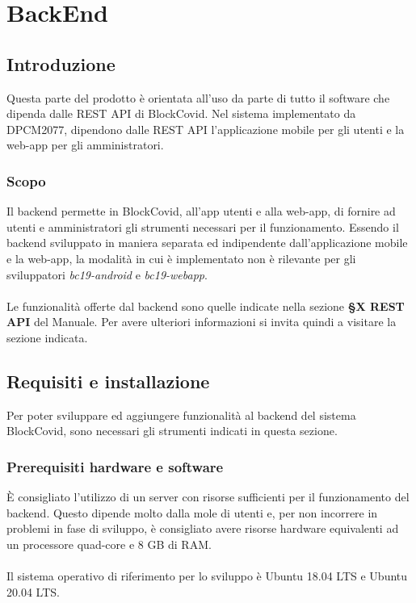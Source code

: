 \section{BackEnd}
\subsection{Introduzione}
Questa parte del prodotto è orientata all'uso da parte di tutto il software che dipenda dalle REST API di BlockCovid. Nel sistema implementato da DPCM2077, dipendono dalle REST API l'applicazione mobile per gli utenti e la web-app per gli amministratori.

\subsubsection{Scopo}
Il backend permette in BlockCovid, all'app utenti e alla web-app, di fornire ad utenti e amministratori gli strumenti necessari per il funzionamento. Essendo il backend sviluppato in maniera separata ed indipendente dall'applicazione mobile e la web-app, la modalità in cui è implementato non è rilevante per gli sviluppatori \textit{bc19-android} e \textit{bc19-webapp}.
\\
\\
Le funzionalità offerte dal backend sono quelle indicate nella sezione \textbf{§X REST API} del Manuale. Per avere ulteriori informazioni si invita quindi a visitare la sezione indicata.


\subsection{Requisiti e installazione}
Per poter sviluppare ed aggiungere funzionalità al backend del sistema BlockCovid, sono necessari gli strumenti indicati in questa sezione.

\subsubsection{Prerequisiti hardware e software}
È consigliato l'utilizzo di un server con risorse sufficienti per il funzionamento del backend. Questo dipende molto dalla mole di utenti e, per non incorrere in problemi in fase di sviluppo, è consigliato avere risorse hardware equivalenti ad un processore quad-core e 8 GB di RAM.
\\\\
Il sistema operativo di riferimento per lo sviluppo è Ubuntu 18.04 LTS e Ubuntu 20.04 LTS.


